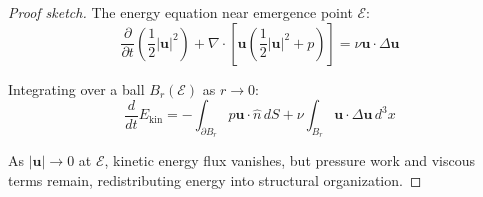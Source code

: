 \begin{proof}[Proof sketch]
The energy equation near emergence point $\mathcal{E}$:
\begin{equation}
\frac{\partial}{\partial t}\left(\frac{1}{2}|\mathbf{u}|^2\right) + \nabla \cdot \left[\mathbf{u}\left(\frac{1}{2}|\mathbf{u}|^2 + p\right)\right] = \nu \mathbf{u} \cdot \Delta \mathbf{u}
\end{equation}

Integrating over a ball $B_r(\mathcal{E})$ as $r \to 0$:
\begin{equation}
\frac{d}{dt} E_{\text{kin}} = -\int_{\partial B_r} p \mathbf{u} \cdot \hat{n} \, dS + \nu \int_{B_r} \mathbf{u} \cdot \Delta \mathbf{u} \, d^3x
\end{equation}

As $|\mathbf{u}| \to 0$ at $\mathcal{E}$, kinetic energy flux vanishes, but pressure work and viscous terms remain, redistributing energy into structural organization.
\end{proof}

